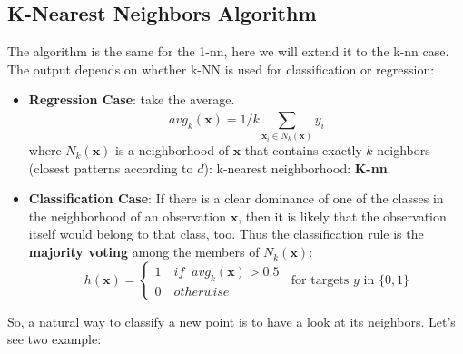 \documentclass[../main.tex]{subfiles}
\begin{document}
\subsection{K-Nearest Neighbors Algorithm}
The algorithm is the same for the 1-nn, here we will extend it to the k-nn case. The output depends on whether k-NN is used for classification or regression: 
\begin{itemize}
    \item \textbf{Regression Case}: take the average.
    $$ avg_k(\mathbf{x}) = 1/k \sum_{\mathbf{x}_i \in N_k(\mathbf{x})}^{} y_i$$
    where $N_k(\mathbf{x})$ is a neighborhood of $\mathbf{x}$ that contains exactly $k$ neighbors (closest patterns according to $d$): k-nearest neighborhood: \textbf{K-nn}.
    
    \item \textbf{Classification Case}: If there is a clear dominance of one of the classes in the neighborhood of an observation $\mathbf{x}$, then it is likely that the observation itself would belong to that class, too. Thus the classification rule is the \textbf{majority voting} among the members of $N_k(\mathbf{x})$:
    \[
    h(\textbf{x}) = \left\{
                \begin{array}{ll}
                  1 \quad if \;\; avg_k(\mathbf{x})>0.5\\
                  0 \quad otherwise
                \end{array}
              \right. \;\;\text{for targets } y \text{ in } \{0,1\} 
    \]
\end{itemize}
So, a natural way to classify a new point is to have a look at its neighbors. Let's see two example:\\
\end{document}
